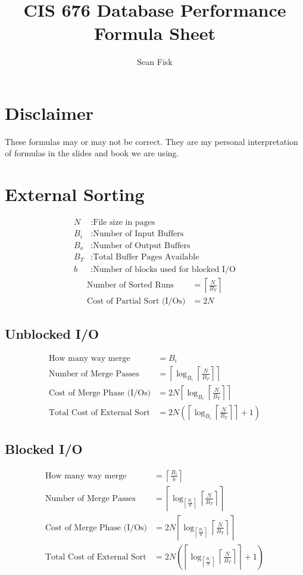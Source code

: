 \documentclass{article}
\title{CIS 676 Database Performance Formula Sheet}
\author{Sean Fisk \mailtohref{sean@seanfisk.com}}
\newcommand{\ceil}[1]{\left\lceil#1\right\rceil}
\newcommand{\paren}[1]{\left(#1\right)}
\begin{document}
\maketitle

\section*{Disclaimer}

These formulas may or may not be correct. They are my personal
interpretation of formulas in the slides and book we are using.

\section{External Sorting}

\begin{align*}
  N &: \text{File size in pages} \\
  B_i &: \text{Number of Input Buffers} \\
  B_o &: \text{Number of Output Buffers} \\
  B_T &: \text{Total Buffer Pages Available} \\
  b &: \text{Number of blocks used for blocked I/O}
\end{align*}
\begin{align}
  \text{Number of Sorted Runs} &= \ceil{\frac{N}{B_T}}\\
  \text{Cost of Partial Sort (I/Os)} &= 2N
\end{align}

\subsection{Unblocked I/O}
\begin{align}
  \text{How many way merge} &= B_i \\
  \text{Number of Merge Passes} &= \ceil{\log_{B_i}\ceil{\frac{N}{B_T}}} \\
  \text{Cost of Merge Phase (I/Os)} &= 2N\ceil{\log_{B_i}\ceil{\frac{N}{B_T}}} \\
  \text{Total Cost of External Sort} &= 2N\paren{\ceil{\log_{B_i}\ceil{\frac{N}{B_T}}} + 1}
\end{align}

\subsection{Blocked I/O}
\begin{align}
  \text{How many way merge} &= \ceil{\frac{B_i}{b}} \\
  \text{Number of Merge Passes} &= \ceil{\log_{\ceil{\frac{B_i}{b}}}\ceil{\frac{N}{B_T}}} \\
  \text{Cost of Merge Phase (I/Os)} &= 2N\ceil{\log_{\ceil{\frac{B_i}{b}}}\ceil{\frac{N}{B_T}}} \\
  \text{Total Cost of External Sort} &= 2N\paren{\ceil{\log_{\ceil{\frac{B_i}{b}}}\ceil{\frac{N}{B_T}}} + 1}
\end{align}
\end{document}
